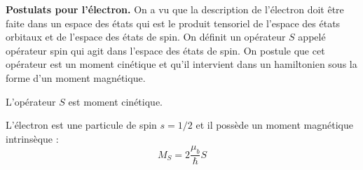 \documentclass[12pt]{book}
\begin{document}
\begin{exmp}
{\bf Postulats pour l'\'electron.}
On a vu que la description de l'\'electron doit \^etre faite dans un
espace des \'etats qui est le produit tensoriel de l'espace des
\'etats orbitaux et de l'espace des \'etats de spin.
On d\'efinit un op\'erateur $S$ appel\'e op\'erateur spin qui agit
dans l'espace des \'etats de spin.
On postule que cet op\'erateur est un moment cin\'etique et qu'il
intervient dans un hamiltonien sous la forme d'un moment magn\'etique.
\begin{postulat}
L'op\'erateur $S$ est moment cin\'etique.
\end{postulat}
\begin{postulat}
L'\'electron est une particule de spin $s=1/2$ et il poss\`ede un moment
magn\'etique intrins\`eque :
\begin{equation}
M_S=2\frac{\mu_b}{\hbar}S
\end{equation}
\end{postulat}
\end{exmp}
\end{document}
